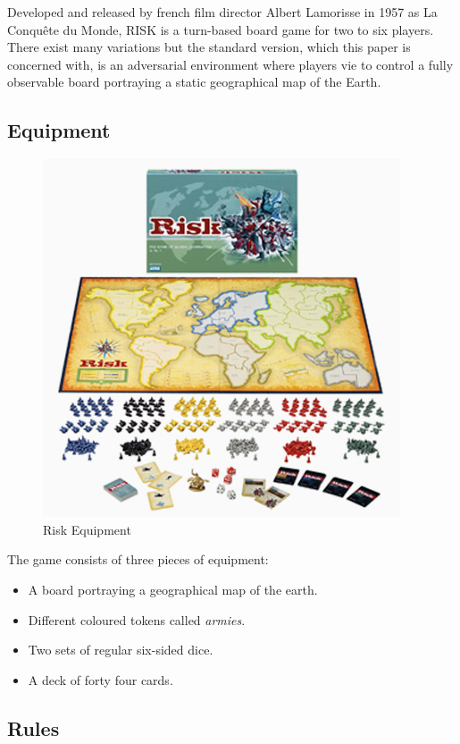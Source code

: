 \documentclass[parskip]{cs4rep}
\begin{document}
Developed and released by french film director Albert Lamorisse in 1957 as La Conqu\^ete du Monde, RISK is a turn-based board game for two to six players. There exist many variations but the standard version, which this paper is concerned with, is an adversarial environment where players vie to control a fully observable board portraying a static geographical map of the Earth.

\subsection{Equipment}

\begin{figure}[h]
\centering
\includegraphics{images/risk-board}
\caption{Risk Equipment}
\label{fig:risk-equipment}
\end{figure}

The game consists of three pieces of equipment:

\begin{itemize}
\item
A board portraying a geographical map of the earth.
\item
Different coloured tokens called \textit{armies}.
\item
Two sets of regular six-sided dice.
\item
A deck of forty four cards.
\end{itemize}

\subsection{Rules}
\end{document}
